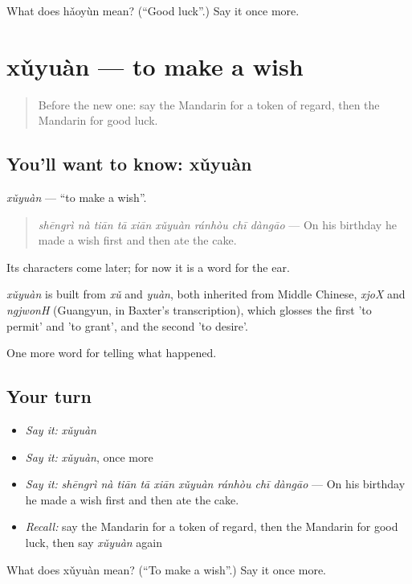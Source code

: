 \begin{tcolorbox}[breakable,colback=teal!4,colframe=teal!35!black,title={Before you move on}]
What does hǎoyùn mean? (\textquotedblleft{}Good luck\textquotedblright{}.) Say it once more.
\end{tcolorbox}
\section[xǔyuàn]{xǔyuàn — to make a wish}

\label{lesson:ZH-C337-xuyuan}



\begin{quote}
Before the new one: say the Mandarin for a token of regard, then the Mandarin for good luck.
\end{quote}

\subsection*{You'll want to know: xǔyuàn}
\emph{xǔyuàn} — \textquotedblleft{}to make a wish\textquotedblright{}.

\begin{quote}
\emph{shēngrì nà tiān tā xiān xǔyuàn ránhòu chī dàngāo} — On his birthday he made a wish first and then ate the cake.
\end{quote}

Its characters come later; for now it is a word for the ear.

\begin{cousinweb}
\emph{xǔyuàn} is built from \emph{xǔ} and \emph{yuàn}, both inherited from Middle Chinese, \emph{xjoX} and \emph{ngjwonH} (Guangyun, in Baxter's transcription), which glosses the first 'to permit' and 'to grant', and the second 'to desire'.
\end{cousinweb}

\begin{grammarlens}[title={What you've built}]
One more word for telling what happened.
\end{grammarlens}

\subsection*{Your turn}
\begin{itemize}
\raggedright
  \item \emph{Say it:} \emph{xǔyuàn}
  \item \emph{Say it:} \emph{xǔyuàn}, once more
  \item \emph{Say it:} \emph{shēngrì nà tiān tā xiān xǔyuàn ránhòu chī dàngāo} — On his birthday he made a wish first and then ate the cake.
  \item \emph{Recall:} say the Mandarin for a token of regard, then the Mandarin for good luck, then say \emph{xǔyuàn} again
\end{itemize}

\begin{tcolorbox}[breakable,colback=teal!4,colframe=teal!35!black,title={Before you move on}]
What does xǔyuàn mean? (\textquotedblleft{}To make a wish\textquotedblright{}.) Say it once more.
\end{tcolorbox}
